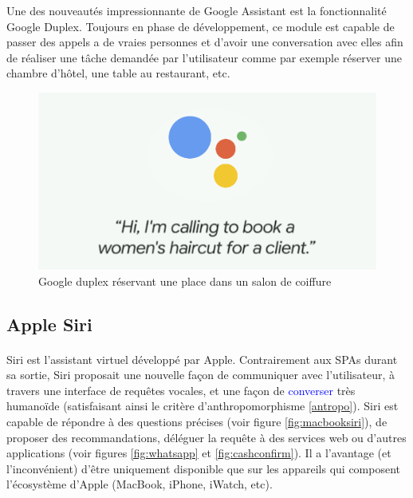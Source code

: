 \par Une des nouveautés impressionnante de Google Assistant est la fonctionnalité Google Duplex. Toujours en phase de développement, ce module est capable de passer des appels a de vraies personnes et d'avoir une conversation avec elles afin de réaliser une tâche demandée par l'utilisateur comme par exemple réserver une chambre d'hôtel, une table au restaurant, etc. 
\begin{figure}[H]
	\centering
	\includegraphics[width=.5\linewidth]{images/google_assitant/duplex.png} 
	\caption{Google duplex réservant une place dans un salon de coiffure} 
\end{figure}


\subsection{Apple Siri}\label{siri}
\paragraph{}
Siri est l'assistant virtuel développé par Apple. Contrairement aux SPAs durant sa sortie, Siri proposait une nouvelle façon de communiquer avec l'utilisateur, à travers une interface de requêtes vocales, et une façon de \textcolor{blue}{converser} très humanoïde (satisfaisant ainsi le critère d'anthropomorphisme \ref{antropo}).
Siri est capable de répondre à des questions précises (voir figure \ref{fig:macbooksiri}), de proposer des recommandations, déléguer la requête à des services web ou d'autres applications (voir figures \ref{fig:whatsapp} et \ref{fig:cashconfirm}). Il a l'avantage (et l'inconvénient) d'être uniquement disponible que sur les appareils qui composent l'écosystème d'Apple (MacBook, iPhone, iWatch, etc).

